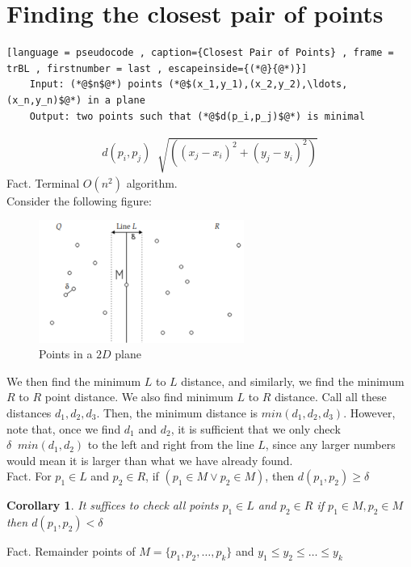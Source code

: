 \documentclass[a4paper]{article}
\theoremstyle{plain}
\newtheorem*{cor}{Corollary}
\newcommand*{\MyDef}{\mathrm{def}}
\newcommand*{\eqdef}{\ensuremath{\mathop{\overset{\MyDef}{=}}}}
\theoremstyle{definition}
\theoremstyle{remark}
\begin{document}
	\section{Finding the closest pair of points}
	\begin{lstlisting}[language = pseudocode , caption={Closest Pair of Points} , frame = trBL , firstnumber = last , escapeinside={(*@}{@*)}]
	Input: (*@$n$@*) points (*@$(x_1,y_1),(x_2,y_2),\ldots,(x_n,y_n)$@*) in a plane
	Output: two points such that (*@$d(p_i,p_j)$@*) is minimal
	\end{lstlisting}
	\begin{align*}
		d(p_i,p_j) \eqdef \sqrt{\left(\left( x_j -x_i \right)^2 + \left( y_j - y_i \right)^2   \right) } 
	\end{align*}
	Fact. Terminal $O(n^2)$ algorithm. \\
	Consider the following figure:
	\begin{figure}[H]
		\centering
		\includegraphics[width=0.6\textwidth]{points.png}
		\caption{Points in a $2D$ plane}
		\label{fig:points-png}
	\end{figure}
	We then find the minimum $L$ to $L$ distance, and similarly, we find the minimum $R$ to $R$ point distance. We also find minimum $L$ to $R$ distance. Call all these distances $d_1,d_2,d_3$. Then, the minimum distance is $min(d_1,d_2,d_3)$. However, note that, once we find $d_1$ and $d_2$, it is sufficient that we only check $\delta \eqdef min(d_1,d_2)$ to the left and right from the line $L$, since any larger numbers would mean it is larger than what we have already found. \\
	Fact. For $p_1 \in L$ and $p_2 \in R$, if $\left( p_1 \in M \lor p_2 \in M \right) $, then $d(p_1,p_2) \ge \delta$
	\begin{cor}
		It suffices to check all points $p_1 \in L$ and $p_2 \in R$ if $p_1 \in M, p_2 \in M$ then $d(p_1,p_2) < \delta$
	\end{cor}
	Fact. Remainder points of $M = \{p_1,p_2,\ldots,p_k\}$ and $y_1\le y_2\le \ldots\le y_k$
\end{document}
